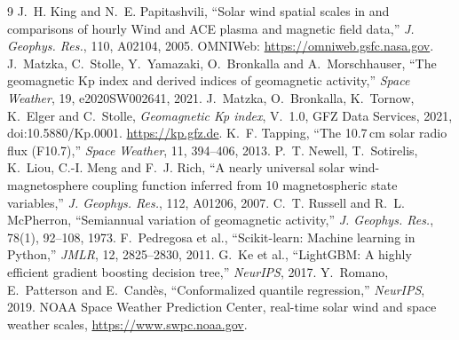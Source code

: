 \documentclass[11pt,a4paper]{article}
\begin{document}
{\small
\begin{thebibliography}{9}\setlength{\itemsep}{0pt}
 J.~H. King and N.~E. Papitashvili, ``Solar wind spatial scales in and comparisons of hourly
Wind and ACE plasma and magnetic field data,'' \emph{J. Geophys. Res.}, 110, A02104, 2005.
OMNIWeb: \url{https://omniweb.gsfc.nasa.gov}.
 J.~Matzka, C.~Stolle, Y.~Yamazaki, O.~Bronkalla and A.~Morschhauser, ``The geomagnetic Kp
index and derived indices of geomagnetic activity,'' \emph{Space Weather}, 19, e2020SW002641, 2021.
 J.~Matzka, O.~Bronkalla, K.~Tornow, K.~Elger and C.~Stolle, \emph{Geomagnetic Kp index}, V.~1.0,
GFZ Data Services, 2021, doi:10.5880/Kp.0001. \url{https://kp.gfz.de}.
 K.~F. Tapping, ``The 10.7\,cm solar radio flux (F10.7),'' \emph{Space Weather}, 11,
394--406, 2013.
 P.~T. Newell, T.~Sotirelis, K.~Liou, C.-I. Meng and F.~J. Rich, ``A nearly universal solar
wind-magnetosphere coupling function inferred from 10 magnetospheric state variables,'' \emph{J. Geophys. Res.},
112, A01206, 2007.
 C.~T. Russell and R.~L. McPherron, ``Semiannual variation of geomagnetic activity,''
\emph{J. Geophys. Res.}, 78(1), 92--108, 1973.
 F.~Pedregosa et al., ``Scikit-learn: Machine learning in Python,'' \emph{JMLR}, 12,
2825--2830, 2011.
 G.~Ke et al., ``LightGBM: A highly efficient gradient boosting decision tree,'' \emph{NeurIPS}, 2017.
 Y.~Romano, E.~Patterson and E.~Cand\`es, ``Conformalized quantile regression,''
\emph{NeurIPS}, 2019.
 NOAA Space Weather Prediction Center, real-time solar wind and space weather scales,
\url{https://www.swpc.noaa.gov}.
\end{thebibliography}}
\end{document}
